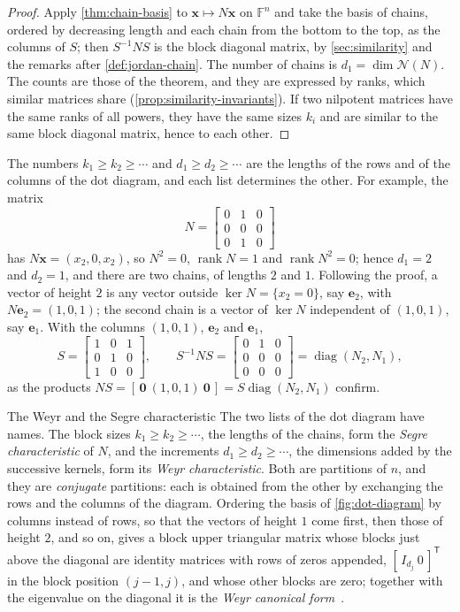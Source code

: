 \begin{proof}
Apply \cref{thm:chain-basis} to $\mathbf x\mapsto N\mathbf x$ on $\mathbb F^n$ and take the basis of chains, ordered by decreasing length and each chain from the bottom to the top, as the columns of $S$; then $S^{-1}NS$ is the block diagonal matrix, by \cref{sec:similarity} and the remarks after \cref{def:jordan-chain}. The number of chains is $d_1=\dim\mathcal N(N)$. The counts are those of the theorem, and they are expressed by ranks, which similar matrices share (\cref{prop:similarity-invariants}). If two nilpotent matrices have the same ranks of all powers, they have the same sizes $k_i$ and are similar to the same block diagonal matrix, hence to each other.
\end{proof}

The numbers $k_1\ge k_2\ge\cdots$ and $d_1\ge d_2\ge\cdots$ are the lengths of the rows and of the columns of the dot diagram, and each list determines the other. For example, the matrix
\[
N=\begin{bmatrix}0&1&0\\0&0&0\\0&1&0\end{bmatrix}
\]
has $N\mathbf x=(x_2,0,x_2)$, so $N^2=0$, $\operatorname{rank}N=1$ and $\operatorname{rank}N^2=0$; hence $d_1=2$ and $d_2=1$, and there are two chains, of lengths $2$ and $1$. Following the proof, a vector of height $2$ is any vector outside $\ker N=\{x_2=0\}$, say $\mathbf e_2$, with $N\mathbf e_2=(1,0,1)$; the second chain is a vector of $\ker N$ independent of $(1,0,1)$, say $\mathbf e_1$. With the columns $(1,0,1)$, $\mathbf e_2$ and $\mathbf e_1$,
\[
S=\begin{bmatrix}1&0&1\\0&1&0\\1&0&0\end{bmatrix},\qquad S^{-1}NS=\begin{bmatrix}0&1&0\\0&0&0\\0&0&0\end{bmatrix}=\operatorname{diag}(N_2,N_1),
\]
as the products $NS=[\,\mathbf 0\ (1,0,1)\ \mathbf 0\,]=S\operatorname{diag}(N_2,N_1)$ confirm.

\begin{note}{The Weyr and the Segre characteristic}
The two lists of the dot diagram have names. The block sizes $k_1\ge k_2\ge\cdots$, the lengths of the chains, form the \emph{Segre characteristic} of $N$, and the increments $d_1\ge d_2\ge\cdots$, the dimensions added by the successive kernels, form its \emph{Weyr characteristic}. Both are partitions of $n$, and they are \emph{conjugate} partitions: each is obtained from the other by exchanging the rows and the columns of the diagram. Ordering the basis of \cref{fig:dot-diagram} by columns instead of rows, so that the vectors of height $1$ come first, then those of height $2$, and so on, gives a block upper triangular matrix whose blocks just above the diagonal are identity matrices with rows of zeros appended, $[\,I_{d_j}\ 0\,]^{\mathsf T}$ in the block position $(j-1,j)$, and whose other blocks are zero; together with the eigenvalue on the diagonal it is the \emph{Weyr canonical form}~\cite[Sect.~3.4]{horn2013}.
\end{note}

